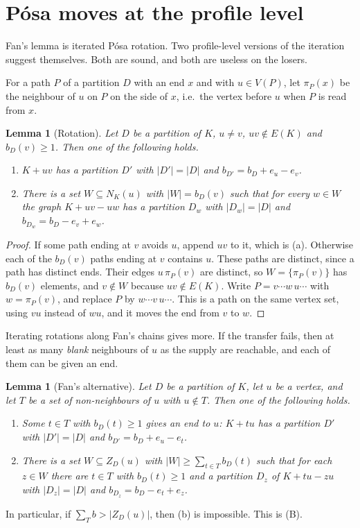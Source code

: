 \documentclass[11pt]{amsart}
\newtheorem{lemma}[theorem]{Lemma}
\theoremstyle{definition}
\begin{document}
\section{P\'osa moves at the profile level}\label{sec:posa}

Fan's lemma is iterated P\'osa rotation. Two profile-level versions of the iteration suggest
themselves. Both are sound, and both are useless on the losers.

For a path $P$ of a partition $D$ with an end $x$ and with $u\in V(P)$, let $\pi_P(x)$ be the
neighbour of $u$ on $P$ on the side of $x$, i.e.\ the vertex before $u$ when $P$ is read from $x$.

\begin{lemma}[Rotation]\label{lem:rot}
Let $D$ be a partition of $K$, $u\ne v$, $uv\notin E(K)$ and $b_D(v)\ge1$. Then one of the
following holds.
\begin{enumerate}[label=(\alph*)]
\item $K+uv$ has a partition $D'$ with $|D'|=|D|$ and $b_{D'}=b_D+e_u-e_v$.
\item There is a set $W\subseteq N_K(u)$ with $|W|=b_D(v)$ such that for every $w\in W$ the graph
$K+uv-uw$ has a partition $D_w$ with $|D_w|=|D|$ and $b_{D_w}=b_D-e_v+e_w$.
\end{enumerate}
\end{lemma}
\begin{proof}
If some path ending at $v$ avoids $u$, append $uv$ to it, which is (a). Otherwise each of the
$b_D(v)$ paths ending at $v$ contains $u$. These paths are distinct, since a path has distinct
ends. Their edges $u\,\pi_P(v)$ are distinct, so $W=\{\pi_P(v)\}$ has $b_D(v)$ elements, and $v\notin
W$ because $uv\notin E(K)$. Write $P=v\cdots w\,u\cdots$ with $w=\pi_P(v)$, and replace $P$ by
$w\cdots v\,u\cdots$. This is a path on the same vertex set, using $vu$ instead of $wu$, and it
moves the end from $v$ to $w$.
\end{proof}

Iterating rotations along Fan's chains gives more. If the transfer fails, then at least as many
\emph{blank} neighbours of $u$ as the supply are reachable, and each of them can be given an end.

\begin{lemma}[Fan's alternative]\label{lem:alt}
Let $D$ be a partition of $K$, let $u$ be a vertex, and let $T$ be a set of non-neighbours of $u$
with $u\notin T$. Then one of the following holds.
\begin{enumerate}[label=(\alph*)]
\item Some $t\in T$ with $b_D(t)\ge1$ gives an end to $u$: $K+tu$ has a partition $D'$ with
$|D'|=|D|$ and $b_{D'}=b_D+e_u-e_t$.
\item There is a set $W\subseteq Z_D(u)$ with $|W|\ge\sum_{t\in T}b_D(t)$ such that for each
$z\in W$ there are $t\in T$ with $b_D(t)\ge1$ and a partition $D_z$ of $K+tu-zu$ with
$|D_z|=|D|$ and $b_{D_z}=b_D-e_t+e_z$.
\end{enumerate}
\end{lemma}
In particular, if $\sum_Tb>|Z_D(u)|$, then (b) is impossible. This is (B).
\end{document}
